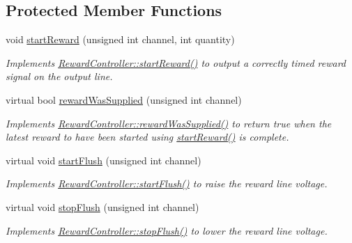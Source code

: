 \subsection*{Protected Member Functions}
\begin{DoxyCompactItemize}
\item 
void \hyperlink{class_picto_1_1_picto_box_x_p_reward_controller_a8490db56a1df896a33362aeea7c0cafc}{start\-Reward} (unsigned int channel, int quantity)
\begin{DoxyCompactList}\small\item\em Implements \hyperlink{class_picto_1_1_reward_controller_a3e09bdba141632e89472bef42dc1e132}{Reward\-Controller\-::start\-Reward()} to output a correctly timed reward signal on the output line. \end{DoxyCompactList}\item 
virtual bool \hyperlink{class_picto_1_1_picto_box_x_p_reward_controller_a3f06b94221e0bec202b4e3236e20429b}{reward\-Was\-Supplied} (unsigned int channel)
\begin{DoxyCompactList}\small\item\em Implements \hyperlink{class_picto_1_1_reward_controller_a213ce91b8ef9019786e96e601d9641b9}{Reward\-Controller\-::reward\-Was\-Supplied()} to return true when the latest reward to have been started using \hyperlink{class_picto_1_1_picto_box_x_p_reward_controller_a8490db56a1df896a33362aeea7c0cafc}{start\-Reward()} is complete. \end{DoxyCompactList}\item 
virtual void \hyperlink{class_picto_1_1_picto_box_x_p_reward_controller_a5dc6d881ee582daaf7eae64be6f8af1e}{start\-Flush} (unsigned int channel)
\begin{DoxyCompactList}\small\item\em Implements \hyperlink{class_picto_1_1_reward_controller_aaf880507edaa44288cd5b17bdb71f079}{Reward\-Controller\-::start\-Flush()} to raise the reward line voltage. \end{DoxyCompactList}\item 
virtual void \hyperlink{class_picto_1_1_picto_box_x_p_reward_controller_ae9567626896a597b6cda39acd1b0aaf5}{stop\-Flush} (unsigned int channel)
\begin{DoxyCompactList}\small\item\em Implements \hyperlink{class_picto_1_1_reward_controller_a5a14b4f103def1711b485cc05f4c53bb}{Reward\-Controller\-::stop\-Flush()} to lower the reward line voltage. \end{DoxyCompactList}\end{DoxyCompactItemize}
